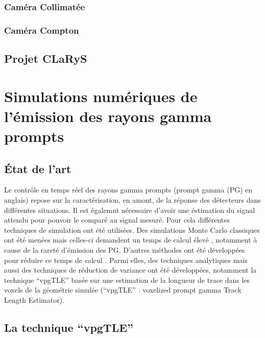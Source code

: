 \documentclass[11pt,a4paper,oldfontcommands]{memoir}
\begin{document}
\subsubsection{Caméra Collimatée}

\subsubsection{Caméra Compton}


\subsection{Projet CLaRyS}



\section{Simulations numériques de l'émission des rayons gamma prompts}

\subsection{\'Etat de l'art}

Le contrôle en temps réel des rayons gamma prompts (prompt gamma (PG) en anglais) repose sur la caractérisation, en amont, de la réponse des détecteurs dans différentes situations. Il est égalemnt nécessaire d'avoir une éstimation du signal attendu pour pouvoir le comparé au signal mesuré.  Pour cela différentes techniques de simulation ont été utilisées. Des simulations Monte Carlo classiques ont été menées mais celles-ci demandent un temps de calcul élevé \cite{KRIMMER201858}, notamment à cause de la rareté d'émission des PG. D'autres méthodes ont été développées pour réduire ce temps de calcul \cite{Qin_2017}. Parmi elles, des techniques analytiques \cite{Sterpin_2015} mais aussi des techniques de réduction de variance ont été développées, notamment la technique \enquote{vpgTLE} basée sur une estimation de la longueur de trace dans les voxels de la géométrie simulée (\enquote{vpgTLE} : voxelized prompt gamma Track Length Estimator).

\subsection{La technique \enquote{vpgTLE}}
\end{document}
